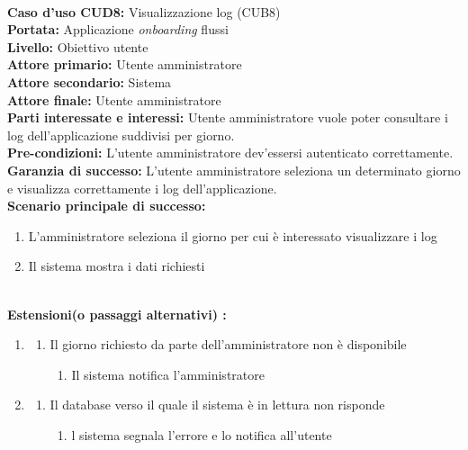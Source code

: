 \ \\
\textbf{Caso d’uso CUD8:} Visualizzazione log (CUB8) \\
\textbf{Portata:} Applicazione \textit{onboarding} flussi\\
\textbf{Livello:} Obiettivo utente \\
\textbf{Attore primario:} Utente amministratore \\
\textbf{Attore secondario:} Sistema \\
\textbf{Attore finale:} Utente amministratore \\
\textbf{Parti interessate e interessi:} 
Utente amministratore vuole poter consultare i \gls{log} dell'applicazione suddivisi per giorno.\\
\textbf{Pre-condizioni:} L’utente amministratore dev'essersi autenticato correttamente.\\
\textbf{Garanzia di successo:} L'utente amministratore seleziona un determinato giorno e visualizza correttamente i \gls{log} dell'applicazione.\\
\textbf{Scenario principale di successo:} 
\begin{enumerate}
  \item L'amministratore seleziona il giorno per cui è interessato visualizzare i \gls{log}
  \item Il sistema mostra i dati richiesti
\end{enumerate} 
\  \\
\textbf{Estensioni(o passaggi alternativi) :}
\begin{enumerate}
\item
    \begin{enumerate}
        \item Il giorno richiesto da parte dell'amministratore non è disponibile
        \begin{enumerate}
            \item Il sistema notifica l'amministratore
        \end{enumerate}
    \end{enumerate}
\item
    \begin{enumerate}
        \item Il database verso il quale il sistema è in lettura non risponde
        \begin{enumerate}
            \item l sistema segnala l’errore e lo notifica all’utente
        \end{enumerate}
    \end{enumerate}
 \end{enumerate} 



